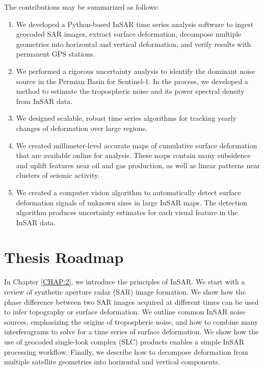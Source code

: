 The contributions may be summarized as follows:

\begin{enumerate}
	
	\item We developed a Python-based InSAR time series analysis software to ingest geocoded SAR images, extract surface deformation, decompose multiple geometries into horizontal and vertical deformation, and verify results with permanent GPS stations.
	
	\item We performed a rigorous uncertainty analysis to identify the dominant noise source in the Permian Basin for Sentinel-1.  In the process, we developed a method to estimate the tropospheric noise and its power spectral density from InSAR data.
	
	\item We designed scalable, robust time series algorithms for tracking yearly changes of deformation over large regions.
	
	\item We created millimeter-level accurate maps of cumulative surface deformation that are available online for analysis. These maps contain many subsidence and uplift features near oil and gas production, as well as linear patterns near clusters of seismic activity.
	
	\item We created a computer vision algorithm to automatically detect surface deformation signals of unknown sizes in large InSAR maps. The detection algorithm produces uncertainty estimates for each visual feature in the InSAR data.
	
	
	
\end{enumerate}


\section{Thesis Roadmap}
\label{sec:chap1-roadmap}


In Chapter \ref{CHAP:2}, we introduce the principles of InSAR. We start with a review of synthetic aperture radar (SAR) image formation. We show how the phase difference between two SAR images acquired at different times can be used to infer topography or surface deformation. We outline common InSAR noise sources, emphasizing the origins of tropospheric noise, and how to combine many interferograms to solve for a time series of surface deformation. We show how the use of geocoded single-look complex (SLC) products enables a simple InSAR processing workflow. Finally, we describe how to decompose deformation from multiple satellite geometries into horizontal and vertical components.


